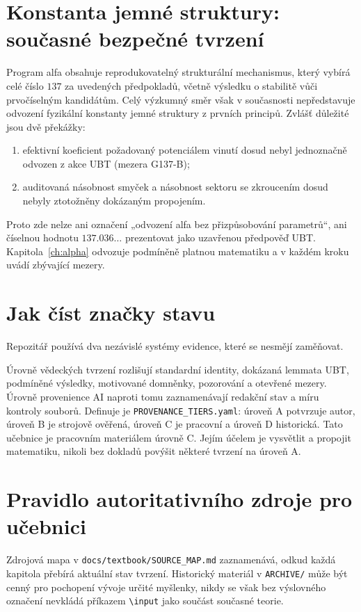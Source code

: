 \section{Konstanta jemné struktury: současné bezpečné tvrzení}
Program alfa obsahuje reprodukovatelný strukturální mechanismus, který vybírá
celé číslo $137$ za uvedených předpokladů, včetně výsledku o stabilitě vůči
prvočíselným kandidátům. Celý výzkumný směr však v současnosti nepředstavuje
odvození fyzikální konstanty jemné struktury z prvních principů. Zvlášť
důležité jsou dvě překážky:
\begin{enumerate}
 \item efektivní koeficient požadovaný potenciálem vinutí dosud nebyl
       jednoznačně odvozen z akce UBT (mezera G137-B);
 \item auditovaná násobnost smyček a násobnost sektoru se zkroucením dosud
       nebyly ztotožněny dokázaným propojením.
\end{enumerate}
Proto zde nelze ani označení „odvození alfa bez přizpůsobování parametrů“, ani číselnou hodnotu
$137.036\ldots$ prezentovat jako uzavřenou předpověď UBT.
Kapitola~\ref{ch:alpha} odvozuje podmíněně platnou matematiku a v každém kroku
uvádí zbývající mezery.

\section{Jak číst značky stavu}
Repozitář používá dva nezávislé systémy evidence, které se nesmějí zaměňovat.

Úrovně vědeckých tvrzení rozlišují standardní identity, dokázaná lemmata UBT,
podmíněné výsledky, motivované domněnky, pozorování a otevřené mezery. Úrovně
provenience AI naproti tomu zaznamenávají redakční stav a míru kontroly souborů.
Definuje je \texttt{PROVENANCE\_TIERS.yaml}: úroveň A potvrzuje autor, úroveň B
je strojově ověřená, úroveň C je pracovní a úroveň D historická. Tato učebnice
je pracovním materiálem úrovně C. Jejím účelem je vysvětlit a propojit
matematiku, nikoli bez dokladů povýšit některé tvrzení na úroveň A.

\section{Pravidlo autoritativního zdroje pro učebnici}
Zdrojová mapa v \texttt{docs/textbook/SOURCE\_MAP.md} zaznamenává, odkud každá
kapitola přebírá aktuální stav tvrzení. Historický materiál v
\texttt{ARCHIVE/} může být cenný pro pochopení vývoje určité myšlenky, nikdy se
však bez výslovného označení nevkládá příkazem
\texttt{\textbackslash input} jako součást současné teorie.
